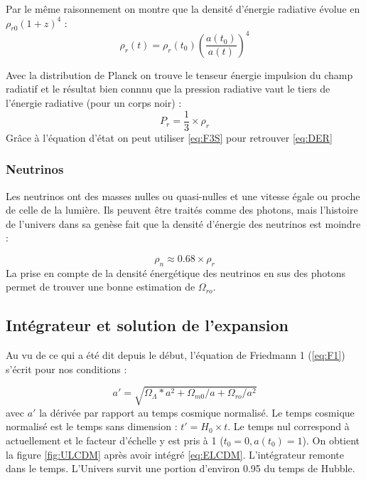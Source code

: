 \documentclass[10pt, a4paper]{report}
\numberwithin{equation}{subsection}
\begin{document}
Par le même raisonnement on montre que la densité d'énergie radiative évolue en $\rho_{r0} (1+z)^4$ :
\begin{equation} \label{eq:DER}
\boxed{\rho_r(t) = \rho_r(t_0)  \left({\frac{a(t_0)}{a(t)}}\right)^4}
\end{equation}

Avec la distribution de Planck on trouve le tenseur énergie impulsion du champ radiatif et le résultat bien connnu que la pression radiative vaut le tiers de l'énergie radiative (pour un corps noir) :
\begin{equation} \label{eq:EER}
\boxed{P_r = \frac{1}{3} \times \rho_r}
\end{equation}
Grâce à l'équation d'état on peut utiliser \ref{eq:F3S} pour retrouver \ref{eq:DER} 

\subsubsection{Neutrinos}
Les neutrinos ont des masses nulles ou quasi-nulles et une vitesse égale ou proche de celle de la lumière. Ils peuvent être traités comme des photons, mais l'histoire de l'univers dans sa genèse fait que la densité d'énergie des neutrinos est moindre :

\begin{equation} \label{eq:EDN}
\boxed{\rho_n \approx 0.68 \times \rho_r}
\end{equation}
La prise en compte de la densité énergétique des neutrinos en sus des photons permet de trouver une bonne estimation de $\Omega_{ro}$.
\subsection{Intégrateur et solution de l'expansion}
Au vu de ce qui a été dit depuis le début, l'équation de Friedmann 1 (\ref{eq:F1}) s'écrit pour nos conditions :

\begin{equation} \label{eq:ELCDM}
\boxed{a' = \sqrt{\Omega_{\Lambda}*a^2+\Omega_{m0}/a+\Omega_{ro}/a^2}}
\end{equation}
avec $a'$ la dérivée par rapport au temps cosmique normalisé. Le temps cosmique normalisé est le temps sans dimension : $t' = H_0 \times t$.  Le temps nul correspond à actuellement et le facteur d'échelle y est pris à 1 ($t_0=0, a(t_0)=1$).  On obtient la figure \ref{fig:ULCDM} après avoir intégré \ref{eq:ELCDM}. L'intégrateur remonte dans le temps. L'Univers survit une portion d'environ 0.95 du temps de Hubble.
\end{document}
